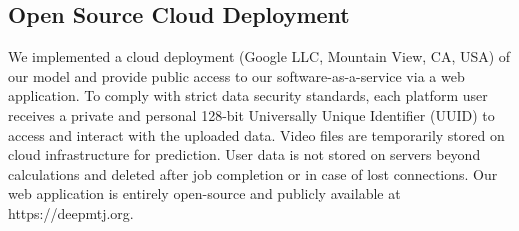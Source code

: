 \documentclass[journal,twoside,web]{ieeecolor}
\begin{document}
\vspace{0.1cm}
\subsection{Open Source Cloud Deployment}
We implemented a cloud deployment (Google LLC, Mountain View, CA, USA) of our model and provide public access to our software-as-a-service via a web application. To comply with strict data security standards, each platform user receives a private and personal 128-bit Universally Unique Identifier (UUID) to access and interact with the uploaded data. Video files are temporarily stored on cloud infrastructure for prediction. User data is not stored on servers beyond calculations and deleted after job completion or in case of lost connections. Our web application is entirely open-source and publicly available at https://deepmtj.org.
\end{document}
